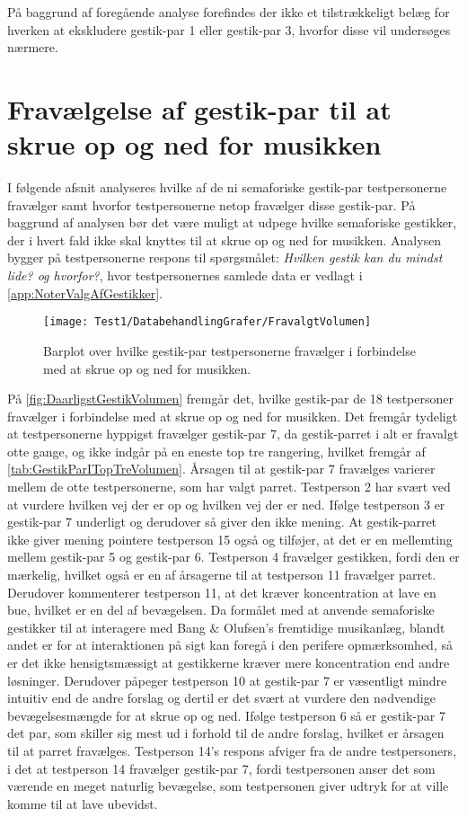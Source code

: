 På baggrund af foregående analyse forefindes der ikke et tilstrækkeligt belæg for hverken at ekskludere gestik-par 1 eller gestik-par 3, hvorfor disse vil undersøges nærmere. 
%
\section{Fravælgelse af gestik-par til at skrue op og ned for musikken}
\label{app:TestresultaterVolumenDaarlig}
%
I følgende afsnit analyseres hvilke af de ni semaforiske gestik-par testpersonerne fravælger samt hvorfor testpersonerne netop fravælger disse gestik-par. På baggrund af analysen bør det være muligt at udpege hvilke semaforiske gestikker, der i hvert fald ikke skal knyttes til at skrue op og ned for musikken. Analysen bygger på testpersonerne respons til spørgsmålet: \textit{Hvilken gestik kan du mindst lide? og hvorfor?}, hvor testpersonernes samlede data er vedlagt i \autoref{app:NoterValgAfGestikker}.
%
\begin{figure}[H]
	\centering
	\texttt{[image: Test1/DatabehandlingGrafer/FravalgtVolumen]}
	\caption{Barplot over hvilke gestik-par testpersonerne fravælger i forbindelse med at skrue op og ned for musikken.}
	\label{fig:DaarligstGestikVolumen}
\end{figure}
\noindent
%
På \autoref{fig:DaarligstGestikVolumen} fremgår det, hvilke gestik-par de 18 testpersoner fravælger i forbindelse med at skrue op og ned for musikken. Det fremgår tydeligt at testpersonerne hyppigst fravælger gestik-par 7, da gestik-parret i alt er fravalgt otte gange, og ikke indgår på en eneste top tre rangering, hvilket fremgår af \autoref{tab:GestikParITopTreVolumen}. Årsagen til at gestik-par 7 fravælges varierer mellem de otte testpersonerne, som har valgt parret. Testperson 2 har svært ved at vurdere hvilken vej der er op og hvilken vej der er ned. Ifølge testperson 3 er gestik-par 7 underligt og derudover så giver den ikke mening. At gestik-parret ikke giver mening pointere testperson 15 også og tilføjer, at det er en mellemting mellem gestik-par 5 og gestik-par 6. Testperson 4 fravælger gestikken, fordi den er mærkelig, hvilket også er en af årsagerne til at testperson 11 fravælger parret. Derudover kommenterer testperson 11, at det kræver koncentration at lave en bue, hvilket er en del af bevægelsen. Da formålet med at anvende semaforiske gestikker til at interagere med Bang $\&$ Olufsen's fremtidige musikanlæg, blandt andet er for at interaktionen på sigt kan foregå i den perifere opmærksomhed, så er det ikke hensigtsmæssigt at gestikkerne kræver mere koncentration end andre løsninger. Derudover påpeger testperson 10 at gestik-par 7 er væsentligt mindre intuitiv end de andre forslag og dertil er det svært at vurdere den nødvendige bevægelsesmængde for at skrue op og ned. Ifølge testperson 6 så er gestik-par 7 det par, som skiller sig mest ud i forhold til de andre forslag, hvilket er årsagen til at parret fravælges. Testperson 14's respons afviger fra de andre testpersoners, i det at testperson 14 fravælger gestik-par 7, fordi testpersonen anser det som værende en meget naturlig bevægelse, som testpersonen giver udtryk for at ville komme til at lave ubevidst.

